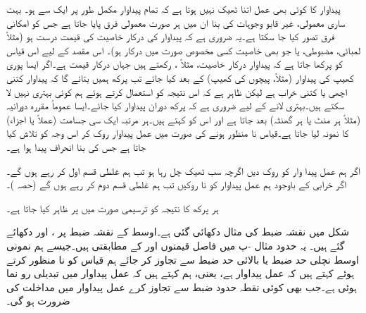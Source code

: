 پیداوار کا کوئی بھی عمل اتنا ٹھیک نہیں ہوتا ہے کہ تمام پیداوار مکمل طور پر ایک  سے ہو۔  بہت ساری معمولی، غیر قابو وجوہات کی بنا ان میں ہر صورت معمولی فرق پایا جاتا ہے جس کو امکانی فرق تصور کیا جا سکتا ہے۔یہ ضروری ہے کہ پیداوار کی درکار خاصیت کی قیمت درست ہو (مثلاً لمبائی، مضبوطی، یا جو بھی خاصیت کسی مخصوص صورت میں درکار ہو)۔ اس مقصد کے لیے اس قیاس کو پرکھا جاتا ہے کہ پیداوار درکار خاصیت، مثلاً ، رکھتے ہیں جہاں  درکار قیمت ہے۔اگر ایسا پوری کھیپ کی پیداوار (مثلاً،  پیچوں کی کھیپ) کے بعد کیا جائے تب پرکھ ہمیں بتائے گا کہ  پیداوار کتنی اچھی یا کتنی خراب ہے لیکن ظاہر ہے کہ اس نتیجہ کو استعمال کرتے ہوئے ہم کوئی بہتری نہیں لا سکتے ہیں۔بہتری لانے کے لیے ضروری ہے کہ پرکھ دوران پیداوار کیا جائے۔ایسا عموماً مقررہ دورانیہ (مثلاً ہر  منٹ یا ہر گھنٹہ) بعد جاتا ہے اور اس کو  کہتے ہیں۔ہر مرتبہ ایک سی جسامت (عملاً  یا  اجزاء) کا نمونہ لیا جاتا ہے۔قیاس نا منظور ہونے کی صورت میں عمل پیداوار روک کر اس وجہ کو تلاش کیا جاتا ہے جس کی بنا انحراف پیدا ہوا ہے۔

اگر ہم عمل پیدا وار کو روک دیں اگرچہ سب ٹھیک چل رہا ہو تب ہم غلطی قسم اول  کر رہے ہوں گے۔اگر خرابی کے باوجود ہم عمل پیداوار کو نا روکیں تب ہم غلطی قسم دوم  کر رہے ہوں گے (حصہ )۔

ہر پرکھ کا نتیجہ کو ترسیمی صورت میں  پر ظاہر کیا جاتا ہے۔

شکل  میں نقشہ ضبط کی مثال دکھائی گئی ہے۔اوسط کے نقشہ ضبط پر  ،   اور   دکھائے گئے ہیں۔ یہ  حدود مثال -پ میں فاصل قیمتوں  اور  کے مطابقتی ہیں۔جیسے ہم نمونی اوسط نچلی حد ضبط یا بالائی حد ضبط سے تجاوز کر جائے ہم قیاس کو نا منظور کرتے ہوئے کہتے ہیں کہ عمل پیداوار  ہے، یعنی، ہم کہتے ہیں کہ عمل پیداوار میں تبدیلی رو نما ہوئی ہے۔جب بھی کوئی نقطہ حدود ضبط سے تجاوز کرے عمل پیداوار میں مداخلت کی ضرورت ہو گی۔

